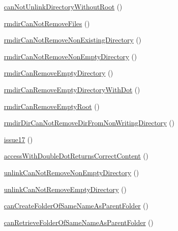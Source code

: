 \begin{DoxyCompactItemize}
\item 
\mbox{\hyperlink{classorg_1_1bovigo_1_1vfs_1_1vfs_stream_wrapper_mk_dir_test_case_a58cad3a0fbea075d976f0a7840111485}{can\+Not\+Unlink\+Directory\+Without\+Root}} ()
\item 
\mbox{\hyperlink{classorg_1_1bovigo_1_1vfs_1_1vfs_stream_wrapper_mk_dir_test_case_a713215f8afb48593806e5f25d4cf0663}{rmdir\+Can\+Not\+Remove\+Files}} ()
\item 
\mbox{\hyperlink{classorg_1_1bovigo_1_1vfs_1_1vfs_stream_wrapper_mk_dir_test_case_a3c6749a61b35e4e7495283d308ad3ef2}{rmdir\+Can\+Not\+Remove\+Non\+Existing\+Directory}} ()
\item 
\mbox{\hyperlink{classorg_1_1bovigo_1_1vfs_1_1vfs_stream_wrapper_mk_dir_test_case_a8773d7afdb140a1b3d685494654a8839}{rmdir\+Can\+Not\+Remove\+Non\+Empty\+Directory}} ()
\item 
\mbox{\hyperlink{classorg_1_1bovigo_1_1vfs_1_1vfs_stream_wrapper_mk_dir_test_case_a38d14330d3ae3c6f6847985cfeeb5d1f}{rmdir\+Can\+Remove\+Empty\+Directory}} ()
\item 
\mbox{\hyperlink{classorg_1_1bovigo_1_1vfs_1_1vfs_stream_wrapper_mk_dir_test_case_a3360d1386b685cf560cadc39f3e30cc3}{rmdir\+Can\+Remove\+Empty\+Directory\+With\+Dot}} ()
\item 
\mbox{\hyperlink{classorg_1_1bovigo_1_1vfs_1_1vfs_stream_wrapper_mk_dir_test_case_a9f0523f748e37355e231e9c65989d3a6}{rmdir\+Can\+Remove\+Empty\+Root}} ()
\item 
\mbox{\hyperlink{classorg_1_1bovigo_1_1vfs_1_1vfs_stream_wrapper_mk_dir_test_case_a891baa352256c9a30ac05da5fee14594}{rmdir\+Dir\+Can\+Not\+Remove\+Dir\+From\+Non\+Writing\+Directory}} ()
\item 
\mbox{\hyperlink{classorg_1_1bovigo_1_1vfs_1_1vfs_stream_wrapper_mk_dir_test_case_a2e29c632253faec694ee55d00d4021ec}{issue17}} ()
\item 
\mbox{\hyperlink{classorg_1_1bovigo_1_1vfs_1_1vfs_stream_wrapper_mk_dir_test_case_a0e1c9c7c01b047ead0fc9ba6a66d0ac2}{access\+With\+Double\+Dot\+Returns\+Correct\+Content}} ()
\item 
\mbox{\hyperlink{classorg_1_1bovigo_1_1vfs_1_1vfs_stream_wrapper_mk_dir_test_case_ab8eedc60050e4ba45bf2b2a97304780a}{unlink\+Can\+Not\+Remove\+Non\+Empty\+Directory}} ()
\item 
\mbox{\hyperlink{classorg_1_1bovigo_1_1vfs_1_1vfs_stream_wrapper_mk_dir_test_case_a3582000190eb4ecb3ba27f7c8dd76233}{unlink\+Can\+Not\+Remove\+Empty\+Directory}} ()
\item 
\mbox{\hyperlink{classorg_1_1bovigo_1_1vfs_1_1vfs_stream_wrapper_mk_dir_test_case_ac9bce2b8e3f82668e9eafc0dfd516c54}{can\+Create\+Folder\+Of\+Same\+Name\+As\+Parent\+Folder}} ()
\item 
\mbox{\hyperlink{classorg_1_1bovigo_1_1vfs_1_1vfs_stream_wrapper_mk_dir_test_case_a7c4b6f71cd31008ba5eff0b18205f0a1}{can\+Retrieve\+Folder\+Of\+Same\+Name\+As\+Parent\+Folder}} ()
\end{DoxyCompactItemize}

